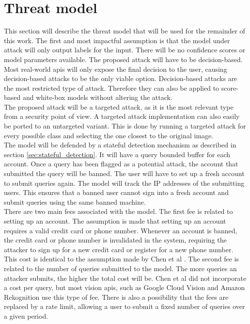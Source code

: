 \section{Threat model}\label{sec:threat_model}
This section will describe the threat model that will be used for the remainder of this work. The first and most impactful assumption is that the model under attack will only output labels for the input. There will be no confidence scores or model parameters available. The proposed attack will have to be decision-based. Most real-world \glspl{api} will only expose the final decision to the user, causing decision-based attacks to be the only viable option. Decision-based attacks are the most restricted type of attack. Therefore they can also be applied to score-based and white-box models without altering the attack.\\

The proposed attack will be a targeted attack, as it is the most relevant type from a security point of view. A targeted attack implementation can also easily be ported to an untargeted variant. This is done by running a targeted attack for every possible class and selecting the one closest to the original image.\\

The model will be defended by a stateful detection mechanism \cite{chen_stateful_2019} as described in section \ref{sec:stateful_detection}. It will have a query bounded buffer for each account. Once a query has been flagged as a potential attack, the account that submitted the query will be banned. The user will have to set up a fresh account to submit queries again. The model will track the IP addresses of the submitting users. This ensures that a banned user cannot sign into a fresh account and submit queries using the same banned machine.\\

There are two main fees associated with the model. The first fee is related to setting up an account. The assumption is made that setting up an account requires a valid credit card or phone number. Whenever an account is banned, the credit card or phone number is invalidated in the system, requiring the attacker to sign up for a new credit card or register for a new phone number. This cost is identical to the assumption made by Chen et al \cite{chen_stateful_2019}. The second fee is related to the number of queries submitted to the model. The more queries an attacker submits, the higher the total cost will be. Chen et al \cite{chen_stateful_2019} did not incorporate a cost per query, but most vision \glspl{api}, such as Google Cloud Vision \cite{google_pricing} and Amazon Rekognition \cite{amazon_pricing} use this type of fee. There is also a possibility that the fees are replaced by a rate limit, allowing a user to submit a fixed number of queries over a given period.\\

